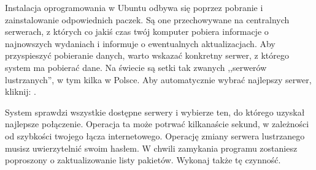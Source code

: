 Instalacja oprogramowania w Ubuntu odbywa się poprzez pobranie i zainstalowanie odpowiednich paczek. Są one przechowywane na centralnych serwerach, z których co jakiś czas twój komputer pobiera informacje o najnowszych wydaniach i informuje o ewentualnych aktualizacjach. Aby przyspieszyć pobieranie danych, warto wskazać konkretny serwer, z którego system ma pobierać dane. Na świecie są setki tak zwanych ,,serwerów lustrzanych'', w tym kilka w Polsce. Aby automatycznie wybrać najlepszy serwer, kliknij: .

System sprawdzi wszystkie dostępne serwery i wybierze ten, do którego uzyskał najlepsze połączenie. Operacja ta może potrwać kilkanaście sekund, w zależności od szybkości twojego łącza internetowego. Operację zmiany serwera lustrzanego musisz uwierzytelnić swoim hasłem. W chwili zamykania programu zostaniesz poproszony o zaktualizowanie listy pakietów. Wykonaj także tę czynność.
